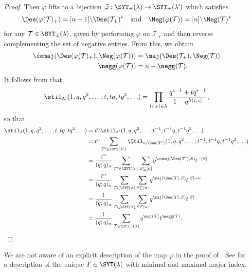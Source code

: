 \begin{proof}
    Then $\varphi$ lifts to a bijection $\widetilde{\varphi} : \SYT_\pm(\lambda) \to \SYT_\pm(\lambda')$ which satisfies
    \[
    \Des(\varphi(\mathcal{T})_+) = [n-1] \backslash \Des(\mathcal{T}_+)^* \quad \text{and} \quad \Neg(\varphi(\mathcal{T})) = [n] \backslash \Neg(\mathcal{T})^*
    \]
    for any $\mathcal{T} \in \SYT_\pm(\lambda)$, given by performing $\varphi$ on $\mathcal{T}_+$ and then reverse complementing the set of negative entries. From this, we obtain
    \begin{align*}
    \comaj(\Des(\varphi(\mathcal{T})_+),\Neg(\varphi(\mathcal{T})))
    &= \maj(\Des(\mathcal{T}_+),\Neg(\mathcal{T})) \\
    \negg(\varphi(\mathcal{T}))
    &= n - \negg(\mathcal{T}).
    \end{align*}
    It follows from  that
    \[
        \stil_{\lambda'}(1,q,q^2,\ldots;t,tq,tq^2,\ldots) = \prod_{(r,c) \in \lambda} \frac{q^{c-1} + tq^{r-1}}{1-q^{h(r,c)}},
    \]
    so that
    \begin{align*}
        \stil_\lambda(1,q,q^2,\ldots;t,tq,tq^2,\ldots) &= t^n\stil_{\lambda'}(1,q,q^2,\ldots;t^{-1},t^{-1}q,t^{-1}q^2,\ldots) \\
        &= t^n \sum_{T' \in \SYT(\lambda')} \Qtil_{n,\Des(T')}(1,q,q^2,\ldots;t^{-1},t^{-1}q,t^{-1}q^2,\ldots) \\
        &= \frac{t^n}{(q;q)_n} \sum_{T' \in \SYT(\lambda')} \sum_{S \subseteq [n]} q^{\comaj(\Des(T'),S)} t^{-|S|} \\
        &= \frac{t^n}{(q;q)_n} \sum_{T \in \SYT(\lambda)} \sum_{S \subseteq [n]} q^{\maj(\Des(T),S)} t^{|S|-n} \\
        &= \frac{1}{(q;q)_n} \sum_{T \in \SYT(\lambda)} \sum_{S \subseteq [n]} q^{\maj(\Des(T),S)} t^{|S|} \\
        &= \frac{1}{(q;q)_n} \sum_{\mathcal{T} \in \SYT_\pm(\lambda)} q^{\maj(\mathcal{T})}t^{\negg(\mathcal{T})}. \qedhere
    \end{align*}
\end{proof}

\begin{rema}
    We are not aware of an explicit description of the map $\varphi$ in the proof of . See \cite[\S4]{BKS} for a description of the unique $T \in \SYT(\lambda)$ with minimal and maximal major index.
\end{rema}

